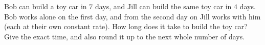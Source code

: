 Bob can build a toy car in $7$ days, and Jill can build the same toy car in $4$ days. Bob works alone on the first day, and from the second day on Jill works with him (each at their own constant rate). How long does it take to build the toy car? Give the exact time, and also round it up to the next whole number of days.
